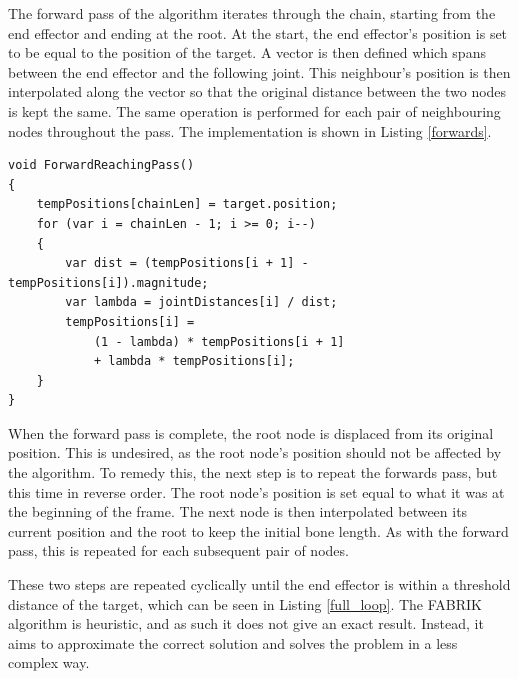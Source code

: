 The forward pass of the algorithm iterates through the chain, starting from the
end effector and ending at the root. At the start, the end effector's position
is set to be equal to the position of the target. A vector is then defined which
spans between the end effector and the following joint. This neighbour's position
is then interpolated along the vector so that the original distance between the
two nodes is kept the same. The same operation is performed for each pair of
neighbouring nodes throughout the pass. The implementation is shown in Listing
\ref{forwards}. 

\begin{lstlisting}[basicstyle=\linespread{0.9}\footnotesize\ttfamily, numbers=none,frame=single,
caption={FABRIK forward reaching pass. \textit{Fabrik.cs}},captionpos=t,
label=forwards, language={[Sharp]c}, float=tp]
void ForwardReachingPass()
{
    tempPositions[chainLen] = target.position;
    for (var i = chainLen - 1; i >= 0; i--)
    {
        var dist = (tempPositions[i + 1] - tempPositions[i]).magnitude;
        var lambda = jointDistances[i] / dist;
        tempPositions[i] =
            (1 - lambda) * tempPositions[i + 1]
            + lambda * tempPositions[i];
    }
}
\end{lstlisting}

When the forward pass is complete, the root node is displaced from its original
position. This is undesired, as the root node's position should not be affected
by the algorithm. To remedy this, the next step is to repeat the forwards pass,
but this time in reverse order. The root node's position is set equal to what it was
at the beginning of the frame. The next node is then interpolated between its
current position and the root to keep the initial bone length. As with the
forward pass, this is repeated for each subsequent pair of nodes. 

These two steps are repeated cyclically until the end effector is within
a threshold distance of the target, which can be seen in Listing
\ref{full_loop}. The FABRIK algorithm is heuristic, and as such it does not give
an exact result. Instead, it aims to approximate the correct solution and solves
the problem in a less complex way.


